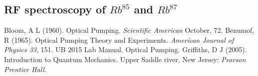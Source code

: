 \documentclass[twocolumn]{article}
\begin{document}
\subsection{RF spectroscopy of $Rb^{85}$ and $Rb^{87}$}


\begin{thebibliography}{9}
Bloom, A L (1960). Optical Pumping. \emph{Scientific American} October, 72.
Benumof, R (1965). Optical Pumping Theory and Experiments. \emph{American 
Journal of Physics 33}, 151.
UB 2015 Lab Manual. Optical Pumping.
Griffiths, D J (2005). Introduction to Quantum Mechanics. Upper Saddle river, 
New Jersey: \emph{Pearson Prentice Hall}.

\end{thebibliography}
\end{document}
